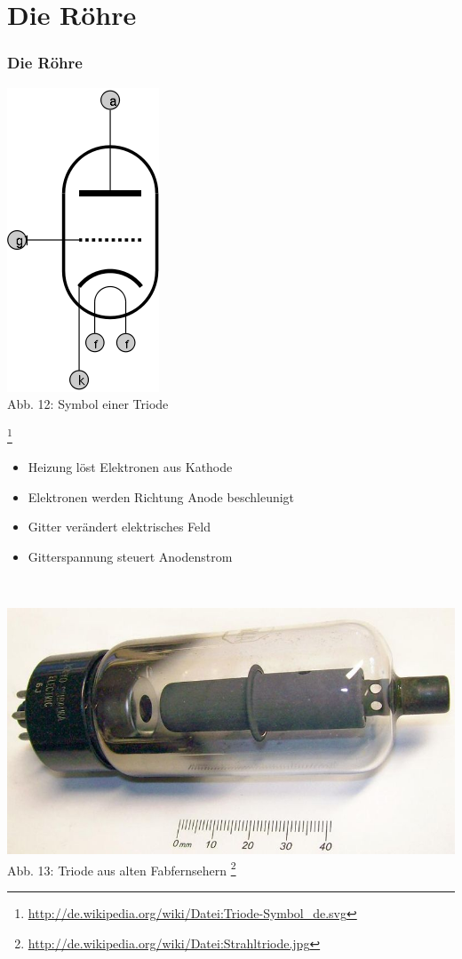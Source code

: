 \section*{Die Röhre}
\begin{frame}
\frametitle{Die Röhre}
\begin{minipage}{0.3\textwidth}
	\includegraphics[scale=0.35]{e13/ERohre.png}\\
	Abb. 12: Symbol einer Triode
\end{minipage}
\footnote{\url{http://de.wikipedia.org/wiki/Datei:Triode-Symbol_de.svg}}
\hspace{0.5cm}
\begin{minipage}{0.5\textwidth}
\begin{small}
	\begin{itemize}
		\item Heizung löst Elektronen aus Kathode
		\item Elektronen werden Richtung Anode beschleunigt
		\item Gitter verändert elektrisches Feld
		\item Gitterspannung steuert Anodenstrom
	\end{itemize}
	\end{small}
\end{minipage}\\
\begin{center}
\includegraphics[scale=0.4 ]{e13/Triode.jpg}\\
	Abb. 13: Triode aus alten Fabfernsehern
	\footnote{\url{http://de.wikipedia.org/wiki/Datei:Strahltriode.jpg}}
\end{center}
\end{frame}

